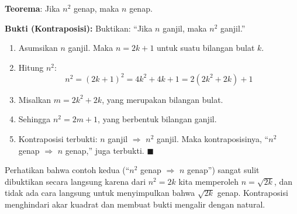 \begin{contoh}
\textbf{Teorema}: Jika $n^2$ genap, maka $n$ genap.

\textbf{Bukti (Kontraposisi):} Buktikan: ``Jika $n$ ganjil, maka $n^2$ ganjil.''

\begin{enumerate}
    \item Asumsikan $n$ ganjil. Maka $n = 2k + 1$ untuk suatu bilangan bulat $k$.
    \item Hitung $n^2$:
    \[ n^2 = (2k + 1)^2 = 4k^2 + 4k + 1 = 2(2k^2 + 2k) + 1 \]
    \item Misalkan $m = 2k^2 + 2k$, yang merupakan bilangan bulat.
    \item Sehingga $n^2 = 2m + 1$, yang berbentuk bilangan ganjil.
    \item Kontraposisi terbukti: $n$ ganjil $\Rightarrow$ $n^2$ ganjil. Maka kontraposisinya, ``$n^2$ genap $\Rightarrow$ $n$ genap,'' juga terbukti. $\blacksquare$
\end{enumerate}
\end{contoh}

\begin{catatan}
Perhatikan bahwa contoh kedua (``$n^2$ genap $\Rightarrow$ $n$ genap'') sangat sulit dibuktikan secara langsung karena dari $n^2 = 2k$ kita memperoleh $n = \sqrt{2k}$, dan tidak ada cara langsung untuk menyimpulkan bahwa $\sqrt{2k}$ genap. Kontraposisi menghindari akar kuadrat dan membuat bukti mengalir dengan natural.
\end{catatan}
